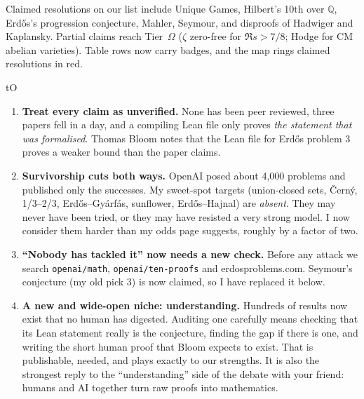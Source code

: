 \documentclass[10pt,a4paper]{article}
\begin{document}
\begin{center}
\end{center}
\noindent Claimed resolutions on our list include Unique Games, Hilbert's 10th over $\mathbb Q$, Erd\H{o}s's
progression conjecture, Mahler, Seymour, and disproofs of Hadwiger and Kaplansky. Partial claims reach Tier~$\Omega$
($\zeta$ zero-free for $\Re s>7/8$; Hodge for CM abelian varieties). Table rows now carry badges, and the map rings
claimed resolutions in red.

\begin{keybox}[breakable,title={What it means for us: my updated opinion}]{tO}
\begin{enumerate}[leftmargin=1.3em]
\item \textbf{Treat every claim as unverified.} None has been peer reviewed, three papers fell in a day, and a
  compiling Lean file only proves \emph{the statement that was formalised}. Thomas Bloom notes that the Lean file
  for Erd\H{o}s problem 3 proves a weaker bound than the paper claims.
\item \textbf{Survivorship cuts both ways.} OpenAI posed about 4{,}000 problems and published only the successes.
  My sweet-spot targets (union-closed sets, \v{C}ern\'y, 1/3--2/3, Erd\H{o}s--Gy\'arf\'as, sunflower,
  Erd\H{o}s--Hajnal) are \emph{absent}. They may never have been tried, or they may have resisted a very strong
  model. I now consider them harder than my odds page suggests, roughly by a factor of two.
\item \textbf{``Nobody has tackled it'' now needs a new check.} Before any attack we search
  \texttt{openai/math}, \texttt{openai/ten-proofs} and erdosproblems.com. Seymour's conjecture (my old pick 3) is
  now claimed, so I have replaced it below.
\item \textbf{A new and wide-open niche: understanding.} Hundreds of results now exist that no human has digested.
  Auditing one carefully means checking that its Lean statement really is the conjecture, finding the gap if
  there is one, and writing the short human proof that Bloom expects to exist. That is publishable, needed, and
  plays exactly to our strengths. It is also the strongest reply to the ``understanding'' side of the debate with
  your friend: humans and AI together turn raw proofs into mathematics.
\end{enumerate}
\end{keybox}
\end{document}
